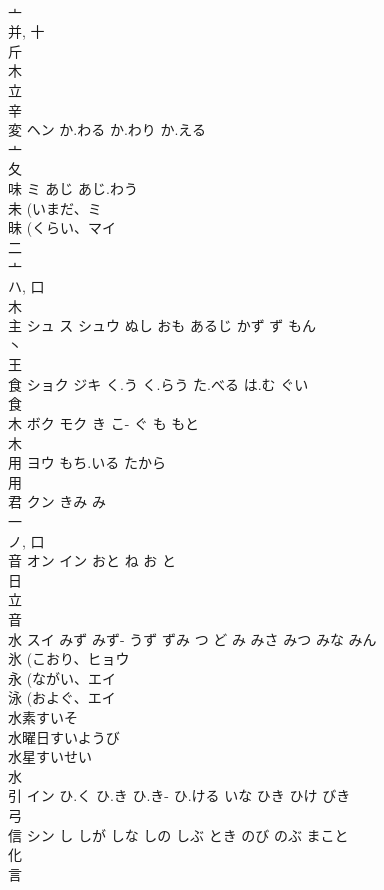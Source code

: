 \documentclass[8pt]{extreport}
\begin{document}
\begin{CJK}{UTF8}{min}
\\	亠 
\\	并, 十 
\\	斤 
\\	木 
\\	立 
\\	辛 
\\	変	ヘン	か.わる か.わり か.える	
\\	亠 
\\	夂 
\\	味	ミ	あじ あじ.わう	
\\	未 (いまだ、ミ 
\\	昧 (くらい、マイ 
\\	二 
\\	亠 
\\	ハ, 口 
\\	木 
\\	主	シュ ス シュウ	ぬし おも あるじ かず ず もん	
\\	丶 
\\	王 
\\	食	ショク ジキ	く.う く.らう た.べる は.む ぐい	
\\	食 
\\	木	ボク モク	き こ- ぐ も もと	
\\	木 
\\	用	ヨウ	もち.いる たから	
\\	用 
\\	君	クン	きみ み	
\\	一 
\\	ノ, 口 
\\	音	オン イン	おと ね お と	
\\	日 
\\	立 
\\	音 
\\	水	スイ	みず みず- うず ずみ つ ど み みさ みつ みな みん	
\\	氷 (こおり、ヒョウ 
\\	永 (ながい、エイ 
\\	泳 (およぐ、エイ 
\\	水素すいそ
\\	水曜日すいようび
\\	水星すいせい
\\	水 
\\	引	イン	ひ.く ひ.き ひ.き- ひ.ける いな ひき ひけ びき	
\\	弓 
\\	信	シン	し しが しな しの しぶ とき のび のぶ まこと	
\\	化 
\\	言 

\end{CJK}
\end{document}
